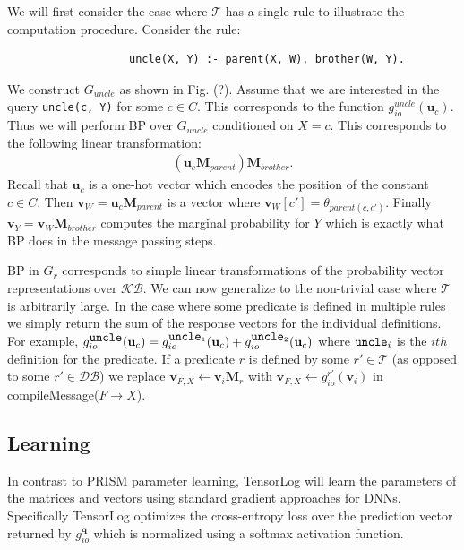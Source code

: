 \documentclass[11pt]{article}
\begin{document}
We will first consider the case where $\mathcal{T}$ has a single rule to illustrate the computation procedure.  Consider the rule: 
\begin{verbatim}
                   uncle(X, Y) :- parent(X, W), brother(W, Y).
\end{verbatim}
We construct $G_{uncle}$ as shown in Fig. (?).  Assume that we are interested in the query \verb!uncle(c, Y)! for some $c \in C$.  This corresponds to the function $g_{io}^{uncle}(\textbf{u}_c)$.  Thus we will perform BP over $G_{uncle}$ conditioned on $X = c$.  This corresponds to the following linear transformation:
\begin{gather*}
(\textbf{u}_c \textbf{M}_{parent})\textbf{M}_{brother}.
\end{gather*}
Recall that $\textbf{u}_c$ is a one-hot vector which encodes the position of the constant $c \in C$.  Then $\textbf{v}_W = \textbf{u}_c \textbf{M}_{parent}$ is a vector where $\textbf{v}_W[c'] = \theta_{parent(c, c')}$.  Finally $\textbf{v}_Y = \textbf{v}_W \textbf{M}_{brother}$ computes the marginal probability for $Y$ which is exactly what BP does in the message passing steps.

BP in $G_r$ corresponds to simple linear transformations of the probability vector representations over $\mathcal{KB}$.  We can now generalize to the non-trivial case where $\mathcal{T}$ is arbitrarily large.  In the case where some predicate is defined in multiple rules we simply return the sum of the response vectors for the individual definitions.  For example, $g_{io}^{\verb!uncle!}(\textbf{u}_c) = g_{io}^{\verb!uncle!_1}(\textbf{u}_c) + g_{io}^{\verb!uncle!_2}(\textbf{u}_c)$ where $\verb!uncle!_i$ is the $ith$ definition for the predicate.  If a predicate $r$ is defined by some $r' \in \mathcal{T}$ (as opposed to some $r' \in \mathcal{DB}$) we replace $\textbf{v}_{F, X} \leftarrow \textbf{v}_i \textbf{M}_r$ with $\textbf{v}_{F, X} \leftarrow g_{io}^{r'}(\textbf{v}_i)$ in compileMessage($F \rightarrow X$).

\subsection{Learning}
In contrast to PRISM parameter learning, TensorLog will learn the parameters of the matrices and vectors using standard gradient approaches for DNNs.  Specifically TensorLog optimizes the cross-entropy loss over the prediction vector returned by $g_{io}^{\textbf{q}}$ which is normalized using a softmax activation function.
\end{document}
